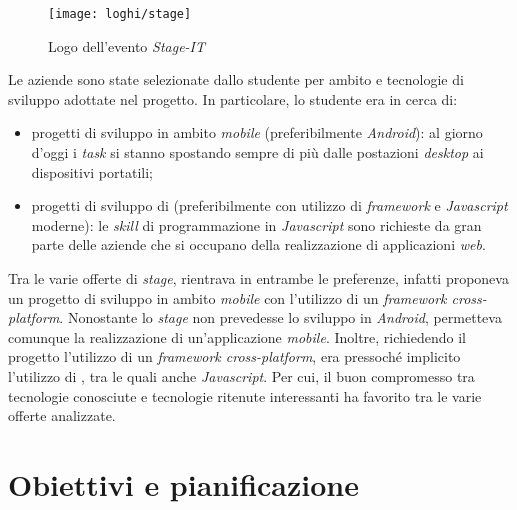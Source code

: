 \begin{figure}[!h] 
    \centering 
    \texttt{[image: loghi/stage]} 
    \caption{Logo dell'evento \textit{Stage-IT}}
\end{figure}

Le aziende sono state selezionate dallo studente per ambito e tecnologie di sviluppo adottate nel progetto. In particolare, lo studente era in cerca di:
\begin{itemize}
	\item progetti di sviluppo in ambito \textit{mobile} (preferibilmente \textit{Android}): al giorno d'oggi i \textit{task} si stanno spostando sempre di più dalle postazioni \textit{desktop} ai dispositivi portatili;
	\item progetti di sviluppo di  (preferibilmente con utilizzo di \textit{framework} e  \textit{Javascript} moderne): le \textit{skill} di programmazione in \textit{Javascript} sono richieste da gran parte delle aziende che si occupano della realizzazione di applicazioni \textit{web}.
\end{itemize}
Tra le varie offerte di \textit{stage}, \visione{} rientrava in entrambe le preferenze, infatti proponeva un progetto di sviluppo in ambito \textit{mobile} con l'utilizzo di un \textit{framework cross-platform}. Nonostante lo \textit{stage} non prevedesse lo sviluppo in  \textit{Android}, permetteva comunque la realizzazione di un'applicazione \textit{mobile}. Inoltre, richiedendo il progetto l'utilizzo di un \textit{framework cross-platform}, era pressoché implicito l'utilizzo di , tra le quali anche \textit{Javascript}. Per cui, il buon compromesso tra tecnologie conosciute e tecnologie ritenute interessanti ha favorito \visione{} tra le varie offerte analizzate.

\newpage

\section{Obiettivi e pianificazione}

